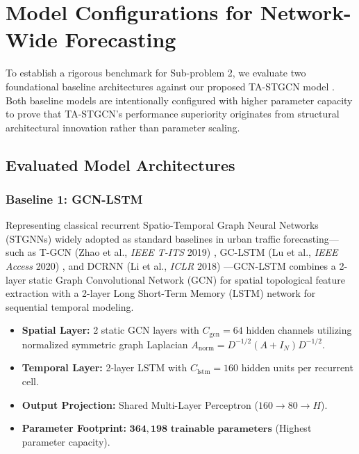 \section{Model Configurations for Network-Wide Forecasting}

To establish a rigorous benchmark for Sub-problem 2, we evaluate two foundational baseline architectures against our proposed TA-STGCN model \cite{stgcn, attention}. Both baseline models are intentionally configured with higher parameter capacity to prove that TA-STGCN's performance superiority originates from structural architectural innovation rather than parameter scaling.

\subsection{Evaluated Model Architectures}

\subsubsection{Baseline 1: GCN-LSTM}
Representing classical recurrent Spatio-Temporal Graph Neural Networks (STGNNs) widely adopted as standard baselines in urban traffic forecasting—such as T-GCN (Zhao et al., \emph{IEEE T-ITS} 2019) \cite{tgcn}, GC-LSTM (Lu et al., \emph{IEEE Access} 2020) \cite{gclstm}, and DCRNN (Li et al., \emph{ICLR} 2018) \cite{dcrnn}—GCN-LSTM combines a 2-layer static Graph Convolutional Network (GCN) \cite{gcn} for spatial topological feature extraction with a 2-layer Long Short-Term Memory (LSTM) network for sequential temporal modeling.
\begin{itemize}
    \item \textbf{Spatial Layer:} 2 static GCN layers \cite{gcn} with $C_{\text{gcn}} = 64$ hidden channels utilizing normalized symmetric graph Laplacian $A_{\text{norm}} = D^{-1/2} (A + I_N) D^{-1/2}$.
    \item \textbf{Temporal Layer:} 2-layer LSTM with $C_{\text{lstm}} = 160$ hidden units per recurrent cell.
    \item \textbf{Output Projection:} Shared Multi-Layer Perceptron ($160 \to 80 \to H$).
    \item \textbf{Parameter Footprint:} $\mathbf{364,198 \text{ trainable parameters}}$ (Highest parameter capacity).
\end{itemize}

